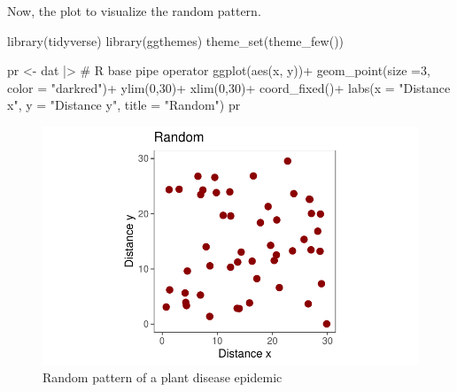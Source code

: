 \documentclass[
  letterpaper,
  DIV=11,
  numbers=noendperiod]{scrreprt}
\newenvironment{Shaded}{\begin{snugshade}}{\end{snugshade}}
\newcommand{\AttributeTok}[1]{\textcolor[rgb]{0.40,0.45,0.13}{#1}}
\newcommand{\CommentTok}[1]{\textcolor[rgb]{0.37,0.37,0.37}{#1}}
\newcommand{\DecValTok}[1]{\textcolor[rgb]{0.68,0.00,0.00}{#1}}
\newcommand{\FunctionTok}[1]{\textcolor[rgb]{0.28,0.35,0.67}{#1}}
\newcommand{\NormalTok}[1]{\textcolor[rgb]{0.00,0.23,0.31}{#1}}
\newcommand{\OtherTok}[1]{\textcolor[rgb]{0.00,0.23,0.31}{#1}}
\newcommand{\SpecialCharTok}[1]{\textcolor[rgb]{0.37,0.37,0.37}{#1}}
\newcommand{\StringTok}[1]{\textcolor[rgb]{0.13,0.47,0.30}{#1}}
\begin{document}
Now, the plot to visualize the random pattern.

\begin{Shaded}
\begin{Highlighting}[]
\FunctionTok{library}\NormalTok{(tidyverse) }
\FunctionTok{library}\NormalTok{(ggthemes)}
\FunctionTok{theme\_set}\NormalTok{(}\FunctionTok{theme\_few}\NormalTok{())}

\NormalTok{pr }\OtherTok{\textless{}{-}}\NormalTok{ dat }\SpecialCharTok{|\textgreater{}} \CommentTok{\# R base pipe operator}
  \FunctionTok{ggplot}\NormalTok{(}\FunctionTok{aes}\NormalTok{(x, y))}\SpecialCharTok{+}
  \FunctionTok{geom\_point}\NormalTok{(}\AttributeTok{size =}\DecValTok{3}\NormalTok{, }
             \AttributeTok{color =} \StringTok{"darkred"}\NormalTok{)}\SpecialCharTok{+}
  \FunctionTok{ylim}\NormalTok{(}\DecValTok{0}\NormalTok{,}\DecValTok{30}\NormalTok{)}\SpecialCharTok{+}
  \FunctionTok{xlim}\NormalTok{(}\DecValTok{0}\NormalTok{,}\DecValTok{30}\NormalTok{)}\SpecialCharTok{+}
  \FunctionTok{coord\_fixed}\NormalTok{()}\SpecialCharTok{+}
  \FunctionTok{labs}\NormalTok{(}\AttributeTok{x =} \StringTok{"Distance x"}\NormalTok{, }\AttributeTok{y =} \StringTok{"Distance y"}\NormalTok{, }
       \AttributeTok{title =} \StringTok{"Random"}\NormalTok{)}
\NormalTok{pr}
\end{Highlighting}
\end{Shaded}

\begin{figure}[H]

{\centering \includegraphics{spatial-patterns_files/figure-pdf/fig-random-1.pdf}

}

\caption{\label{fig-random}Random pattern of a plant disease epidemic}

\end{figure}
\end{document}
